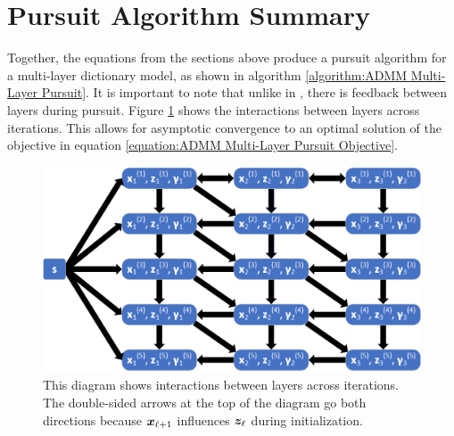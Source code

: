 \section{Pursuit Algorithm Summary}
Together, the equations from the sections above produce a pursuit algorithm for a multi-layer dictionary model, as shown in algorithm \ref{algorithm:ADMM Multi-Layer Pursuit}. It is important to note that unlike in \cite{zeiler2010deconvolutional}, there is feedback between layers during pursuit.  Figure \ref{figure:ADMM Multi-Layer Pursuit Diagram} shows the interactions between layers across iterations. This allows for asymptotic convergence to an optimal solution of the objective in equation \ref{equation:ADMM Multi-Layer Pursuit Objective}.
\begin{figure}
	\includegraphics[width=\textwidth]{figures/multi-layer_ADMM-node-dependencies-Sparse-Coding.png}
	\caption{This diagram shows interactions between layers across iterations. The double-sided arrows at the top of the diagram go both directions because $\bm{x}_{\ell + 1}$ influences $\bm{z}_{\ell}$ during initialization.}
	\label{figure:ADMM Multi-Layer Pursuit Diagram}
\end{figure}
